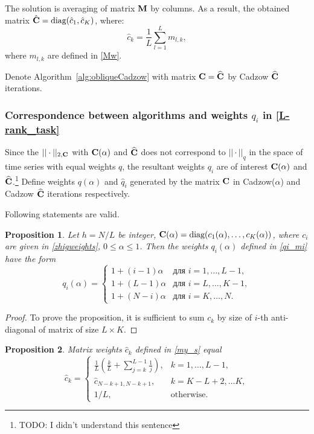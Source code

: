 \documentclass[sii]{ipart}
\newtheorem{proposition}{Proposition}
\begin{document}
The solution is averaging of matrix $\mathbf{M}$ by columns. As a result, the obtained matrix $\hat {\mathbf{C}} = \text{diag}(\hat c_1, \hat c_K)$, where:
\begin{equation}\label{my_s}
\hat c_k = \frac{1}{L}\sum_{l=1}^L m_{l, k},
\end{equation}
where $m_{l, k}$ are defined in \ref{Mw}.

Denote Algorithm~\ref{alg:obliqueCadzow} with matrix $\mathbf{C}=\widehat{\mathbf{C}}$ by Cadzow $\widehat{\mathbf{C}}$ iterations.

\subsubsection{Correspondence between algorithms and weights $q_i$ in \eqref{L-rank_task}}
Since the $||\cdot||_{2, \mathbf{C}}$ with $\mathbf{C}(\alpha)$ and $\widehat {\mathbf{C}}$ does not correspond to $||\cdot||_q$ in the space of time series with equal weights $q$, the resultant weights $q_i$ are of interest $\mathbf{C}(\alpha)$ and $\widehat {\mathbf{C}}$.\footnote{TODO: I didn't understand this sentence}
Define weights $q(\alpha)$ and $\hat q_i$ generated by the matrix $\mathbf{C}$ in Cadzow($\alpha$) and Cadzow $\widehat{\mathbf{C}}$ iterations respectively.

Following statements are valid.

\begin{proposition}\label{zhigconseq}
	Let $h = N/L$ be integer, $\mathbf{C}(\alpha) = \text{diag}(c_1(\alpha), \ldots, c_K(\alpha))$, where $c_i$ are given in \eqref{zhigweights}, $0 \le \alpha \le 1$. Then the weights $q_i(\alpha)$ defined in \eqref{qi_mi} have the form
	\begin{equation*}
	q_i (\alpha) = \begin{cases}
	1 + (i - 1) \alpha & \text{для $i = 1, \ldots, L-1,$}\\
	1 + (L - 1) \alpha & \text{для $i = L, \ldots, K-1,$}\\
	1 + (N - i) \alpha & \text{для $i = K, \ldots, N.$}
	\end{cases}
	\end{equation*}
\end{proposition}
\begin{proof}
	To prove the proposition, it is sufficient to sum $c_k$ by size of $i$-th anti-diagonal of matrix of size $L \times K$.
\end{proof}


\begin{proposition} \label{myweightstat}
	Matrix weights $\hat c_k$ defined in \eqref{my_s} equal
	\begin{equation*}
	\hat c_k = \begin{cases}
	\frac{1}{L}\left(\frac{k}{L} + \sum_{j=k}^{L-1} \frac{1}{j} \right),& k = 1, \ldots, L-1, \\
	\hat c_{N - k + 1, N - k + 1}, & k = K - L + 2, \ldots K, \\
	1/L, &\text{otherwise}.
	\end{cases}
	\end{equation*}
\end{proposition}
\end{document}
